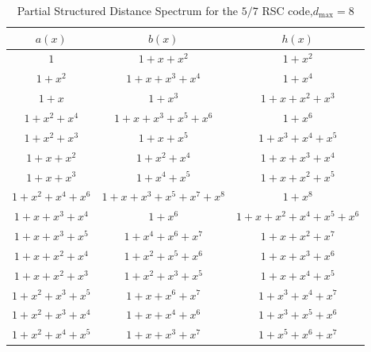 \begin{table*}[h!]
 \caption{Partial Structured Distance Spectrum for the $5/7$ RSC code,$d_{\text{max}}=8$}
\centering
 \begin{tabular}{c c c} 
 \hline
 $a(x)$ & $b(x)$ & $h(x)$ \\ [0.5ex] 
 \hline\hline
$1$ & $1+x+x^{2}$ & $1+x^2$\\
\hline
$1+x^2$ & $1+x+x^3+x^4$ & $1+x^{4}$\\
\hline
$1+x$ & $1+x^3$ & $1+x+x^2+x^3$\\
\hline
$1+x^2+x^4$ & $1+x+x^3+x^5+x^6$ & $1+x^{6}$\\
\hline
$1+x^2+x^3$ & $1+x+x^5$ & $1+x^3+x^4+x^5$\\
\hline
$1+x+x^2$ & $1+x^2+x^4$ & $1+x+x^3+x^4$\\
\hline
$1+x+x^3$ & $1+x^4+x^5$ & $1+x+x^2+x^5$\\
\hline
$1+x^2+x^4+x^6$ & $1+x+x^3+x^5+x^7+x^8$ & $1+x^8$\\
\hline
$1+x+x^3+x^4$ & $1+x^6$ & $1+x+x^2+x^4+x^5+x^6$\\
\hline
$1+x+x^3+x^5$ & $1+x^4+x^6+x^7$ & $1+x+x^2+x^7$\\
\hline
$1+x+x^2+x^4$ & $1+x^2+x^5+x^6$ & $1+x+x^3+x^6$\\
\hline
$1+x+x^2+x^3$ & $1+x^2+x^3+x^5$ & $1+x+x^4+x^5$\\
\hline
$1+x^2+x^3+x^5$ & $1+x+x^6+x^7$ & $1+x^3+x^4+x^7$\\
\hline
$1+x^2+x^3+x^4$ & $1+x+x^4+x^6$ & $1+x^3+x^5+x^6$\\
\hline
$1+x^2+x^4+x^5$ & $1+x+x^3+x^7$ & $1+x^5+x^6+x^7$\\
 \end{tabular}
 
 \label{novelTab13}
\end{table*}

